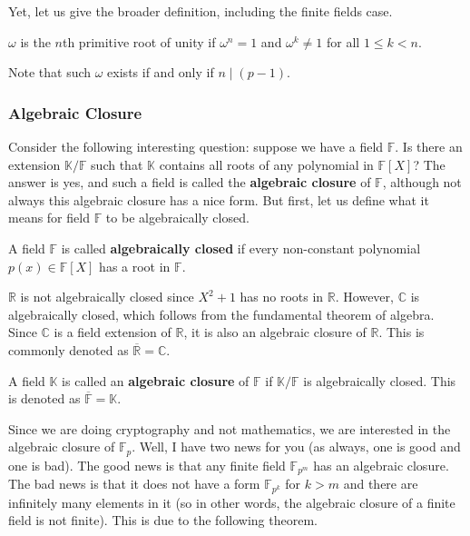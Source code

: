 \documentclass[../lecture-notes.tex]{subfiles}
\begin{document}
Yet, let us give the broader definition, including the finite fields case.

\begin{definition}
    $\omega$ is the $n$th primitive root of unity if $\omega^n=1$ and $\omega^k \neq 1$ for all $1 \leq k < n$.
\end{definition}

Note that such $\omega$ exists if and only if $n \mid (p-1)$. 

\subsubsection{Algebraic Closure}

Consider the following interesting question: suppose we have a field $\mathbb{F}$. Is there an extension $\mathbb{K}/\mathbb{F}$ such that $\mathbb{K}$ contains all roots of any polynomial in $\mathbb{F}[X]$? The answer is yes, and such a field is called the \textbf{algebraic closure} of $\mathbb{F}$, although not always this algebraic closure has a nice form. But first, let us define what it means for field $\mathbb{F}$ to be algebraically closed.

\begin{definition}
    A field $\mathbb{F}$ is called \textbf{algebraically closed} if every non-constant polynomial $p(x) \in \mathbb{F}[X]$ has a root in $\mathbb{F}$.
\end{definition}

\begin{example}
    $\mathbb{R}$ is not algebraically closed since $X^2+1$ has no roots in $\mathbb{R}$. However, $\mathbb{C}$ is algebraically closed, which follows from the fundamental theorem of algebra. Since $\mathbb{C}$ is a field extension of $\mathbb{R}$, it is also an algebraic closure of $\mathbb{R}$. This is commonly denoted as $\overline{\mathbb{R}} = \mathbb{C}$.
\end{example}

\begin{definition}
    A field $\mathbb{K}$ is called an \textbf{algebraic closure} of $\mathbb{F}$ if $\mathbb{K}/\mathbb{F}$ is algebraically closed. This is denoted as $\overline{\mathbb{F}} = \mathbb{K}$.
\end{definition}

Since we are doing cryptography and not mathematics, we are interested in the algebraic closure of $\mathbb{F}_p$. Well, I have two news for you (as always, one is good and one is bad). The good news is that any finite field $\mathbb{F}_{p^m}$ has an algebraic closure. The bad news is that it does not have a form $\mathbb{F}_{p^k}$ for $k>m$ and there are infinitely many elements in it (so in other words, the algebraic closure of a finite field is not finite). This is due to the following theorem.
\end{document}
